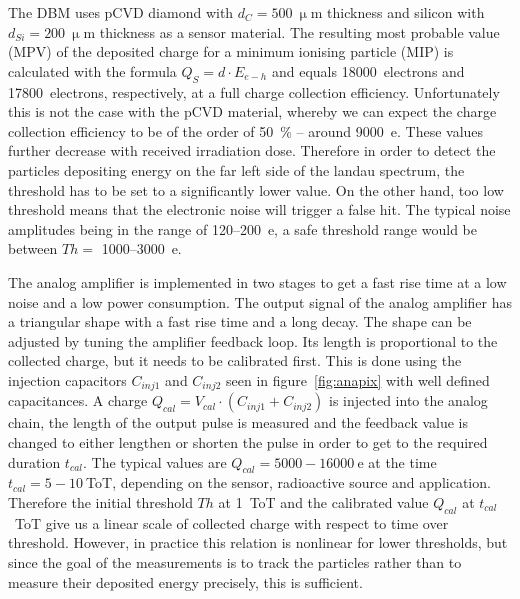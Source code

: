 \documentclass[12pt]{packages/mytustyle}  %
\begin{document}
The DBM uses pCVD diamond with $d_C=500~\upmu$m thickness and silicon with $d_{Si}=200~\upmu$m thickness as a sensor material. The resulting most probable value (MPV) of the deposited charge for a minimum ionising particle (MIP) is calculated with the formula $Q_S=d \cdot E_{e-h}$ and equals 18000~electrons and 17800~electrons, respectively, at a full charge collection efficiency. Unfortunately this is not the case with the pCVD material, whereby we can expect the charge collection efficiency to be of the order of 50~\%  -- around 9000~e. These values further decrease with received irradiation dose. Therefore in order to detect the particles depositing energy on the far left side of the landau spectrum, the threshold has to be set to a significantly lower value. On the other hand, too low threshold means that the electronic noise will trigger a false hit. The typical noise amplitudes being in the range of 120--200~e, a safe threshold range would be between $Th=$ 1000--3000~e.

The analog amplifier is implemented in two stages to get a fast rise time at a low noise and a low power consumption. The output signal of the analog amplifier has a triangular shape with a fast rise time and a long decay.  The shape can be adjusted by tuning the amplifier feedback loop. Its length is proportional to the collected charge, but it needs to be calibrated first. This is done using the injection capacitors $C_{inj1}$ and $C_{inj2}$ seen in figure~\ref{fig:anapix} with well defined capacitances. A charge $Q_{cal}=V_{cal}\cdot(C_{inj1}+C_{inj2})$ is injected into the analog chain, the length of the output pulse is measured and the feedback value is changed to either lengthen or shorten the pulse in order to get to the required duration $t_{cal}$. The typical values are $Q_{cal}=5000-16000~$e at the time $t_{cal}=5-10~$ToT, depending on the sensor, radioactive source and application. Therefore the initial threshold $Th$ at 1~ToT and the calibrated value $Q_{cal}$ at $t_{cal}$~ToT give us a linear scale of collected charge with respect to time over threshold.
However, in practice this relation is nonlinear for lower thresholds, but since the goal of the measurements is to track the particles rather than to measure their deposited energy precisely, this is sufficient. 


\end{document}
